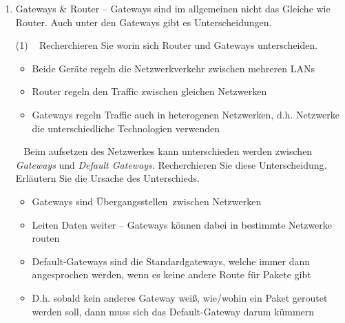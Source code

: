 \documentclass[paper=a4,fontsize=11pt]{scrartcl}%
\numberwithin{equation}{section}
\begin{document}
\begin{center}
\begin{enumerate}
\begin{tasks}
\begin{itemize}
{		netmask NETMASK gw IP\_of\_gateway}
		\item Beispiel: Von LAN A -- 10.0.1.0/29 nach LAN B -- 10.0.2.0/30\\
		\emph{route add -net 10.0.2.0 netmask 255.255.255.248 gw 10.0.1.1}
	\end{itemize}
	\task~ Recherchieren Sie beispielhaft wie eine persistente Lösung aussähe. Kommentieren Sie Ihr Beispiel anschließend, sodass Sie wissen was die einzelnen Zeilen bedeuten.\\
	\# Makiert Anfang des Kommentars -- wird von OS ignoriert
	\end{tasks}
	\begin{lstlisting}[style=Bash, language=Bash, label={netcat_server}]
auto eth0 #automatisches hochfahren von eth0
    iface eth0 inet static # interface eth0 statisch ipv4
        address 10.0.2.2 # ipv4 adresse auf eth0
        netmask 255.255.255.248 # netzwerkmaske
        gateway 10.0.2.1 # gateway -> router
		\end{lstlisting}
	\item Gateways \& Router -- Gateways sind im allgemeinen nicht das Gleiche wie Router. Auch unter den Gateways gibt es Unterscheidungen.
	\begin{tasks}(1)
	\task~ Recherchieren Sie worin sich Router und Gateways unterscheiden.
	\begin{itemize}
		\item Beide Geräte regeln die Netzwerkverkehr zwischen mehreren LANs
		\item Router regeln den Traffic zwischen gleichen Netzwerken
		\item Gateways regeln Traffic auch in heterogenen Netzwerken, d.h. Netzwerke die unterschiedliche Technologien verwenden
	\end{itemize}
	\task~ Beim aufsetzen des Netzwerkes kann unterschieden werden zwischen \emph{Gateways} und \emph{Default Gateways}. Recherchieren Sie diese Unterscheidung. Erläutern Sie die Ursache des Unterschieds.
	\begin{itemize}
		\item Gateways sind \glqq Übergangsstellen\grqq\ zwischen Netzwerken
		\item Leiten Daten weiter -- Gateways können dabei in bestimmte Netzwerke routen
		\item Default-Gateways sind die Standardgateways, welche immer dann angesprochen werden, wenn es keine andere Route für Pakete gibt
		\item D.h. sobald kein anderes Gateway weiß, wie/wohin ein Paket geroutet werden soll, dann muss sich das Default-Gateway darum kümmern

\end{itemize}
\end{tasks}
\end{enumerate}
\end{center}
\end{document}
